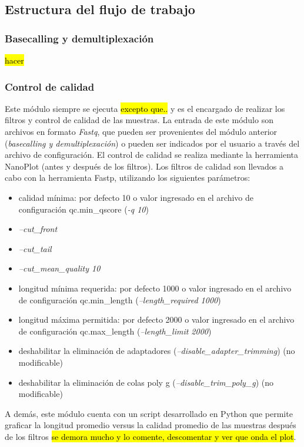 \subsection{Estructura del flujo de trabajo}
\subsubsection{Basecalling y demultiplexación}
\hl{hacer}
\subsubsection{Control de calidad}
Este módulo siempre se ejecuta  \hl{excepto que..} y es el encargado de realizar los filtros y control de calidad de las muestras.
La entrada de este módulo son archivos en formato \textit{Fastq}, que pueden ser provenientes del módulo anterior (\textit{basecalling y demultiplexación}) o pueden ser indicados por el usuario a través del archivo de configuración.
El control de calidad se realiza mediante la herramienta NanoPlot (antes y después de los filtros).
Los filtros de calidad son llevados a cabo con la herramienta Fastp, utilizando los siguientes parámetros:
\begin{itemize}
    \item calidad mínima: por defecto 10 o valor ingresado en el archivo de configuración qc.min\_qscore (\textit{-q 10})
    \item \textit{--cut\_front} 
    \item \textit{--cut\_tail} 
    \item \textit{--cut\_mean\_quality 10} 
    \item longitud mínima requerida: por defecto 1000 o valor ingresado en el archivo de configuración qc.min\_length (\textit{--length\_required 1000}) 
    \item longitud máxima permitida: por defecto 2000 o valor ingresado en el archivo de configuración qc.max\_length (\textit{--length\_limit 2000})
    \item deshabilitar la eliminación de adaptadores (\textit{--disable\_adapter\_trimming}) (no modificable)
    \item deshabilitar la eliminación de colas poly g (\textit{--disable\_trim\_poly\_g}) (no modificable)
\end{itemize}

A demás, este módulo cuenta con un script desarrollado en Python que permite graficar la longitud promedio versus la calidad promedio de las muestras después de los filtros \hl{se demora mucho y lo comente, descomentar y ver que onda el plot}.

